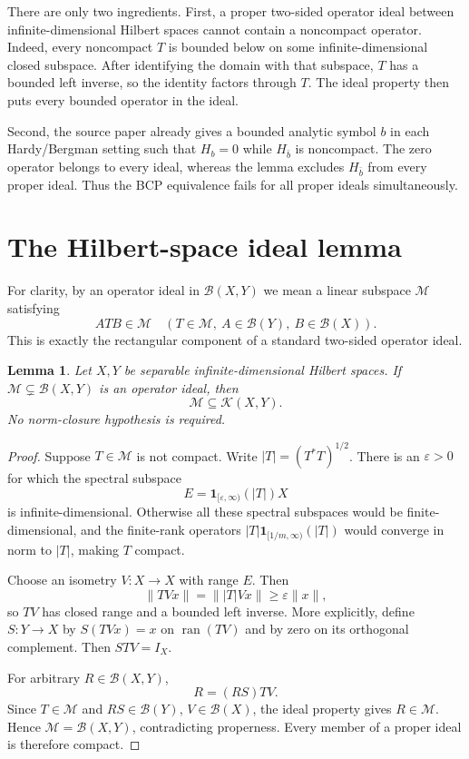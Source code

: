 \documentclass[11pt]{article}
\newtheorem{lemma}{Lemma}
\newcommand{\Bop}{\mathcal B}
\newcommand{\Kop}{\mathcal K}
\begin{document}
There are only two ingredients.  First, a proper two-sided operator ideal
between infinite-dimensional Hilbert spaces cannot contain a noncompact
operator.  Indeed, every noncompact $T$ is bounded below on some
infinite-dimensional closed subspace.  After identifying the domain with that
subspace, $T$ has a bounded left inverse, so the identity factors through $T$.
The ideal property then puts every bounded operator in the ideal.

Second, the source paper already gives a bounded analytic symbol $b$ in each
Hardy/Bergman setting such that $H_b=0$ while $H_{\bar b}$ is noncompact.  The
zero operator belongs to every ideal, whereas the lemma excludes
$H_{\bar b}$ from every proper ideal.  Thus the BCP equivalence fails for all
proper ideals simultaneously.

\section{The Hilbert-space ideal lemma}

For clarity, by an operator ideal in $\Bop(X,Y)$ we mean a linear subspace
$\mathcal M$ satisfying
\[
 A T B\in\mathcal M
 \quad(T\in\mathcal M,\ A\in\Bop(Y),\ B\in\Bop(X)).
\]
This is exactly the rectangular component of a standard two-sided operator
ideal.

\begin{lemma}\label{lem:ideal}
Let $X,Y$ be separable infinite-dimensional Hilbert spaces.  If
$\mathcal M\subsetneq\Bop(X,Y)$ is an operator ideal, then
\[
 \mathcal M\subseteq\Kop(X,Y).
\]
No norm-closure hypothesis is required.
\end{lemma}

\begin{proof}
Suppose $T\in\mathcal M$ is not compact.  Write $|T|=(T^*T)^{1/2}$.  There
is an $\varepsilon>0$ for which the spectral subspace
\[
 E=\mathbf 1_{[\varepsilon,\infty)}(|T|)X
\]
is infinite-dimensional.  Otherwise all these spectral subspaces would be
finite-dimensional, and the finite-rank operators
$|T|\mathbf 1_{[1/m,\infty)}(|T|)$ would converge in norm to $|T|$, making
$T$ compact.

Choose an isometry $V:X\to X$ with range $E$.  Then
\[
 \|TVx\|=\||T|Vx\|\geq\varepsilon\|x\|,
\]
so $TV$ has closed range and a bounded left inverse.  More explicitly, define
$S:Y\to X$ by $S(TVx)=x$ on $\operatorname{ran}(TV)$ and by zero on its
orthogonal complement.  Then $STV=I_X$.

For arbitrary $R\in\Bop(X,Y)$,
\[
 R=(RS)TV.
\]
Since $T\in\mathcal M$ and $RS\in\Bop(Y)$, $V\in\Bop(X)$, the ideal property
gives $R\in\mathcal M$.  Hence $\mathcal M=\Bop(X,Y)$, contradicting
properness.  Every member of a proper ideal is therefore compact.
\end{proof}
\end{document}
